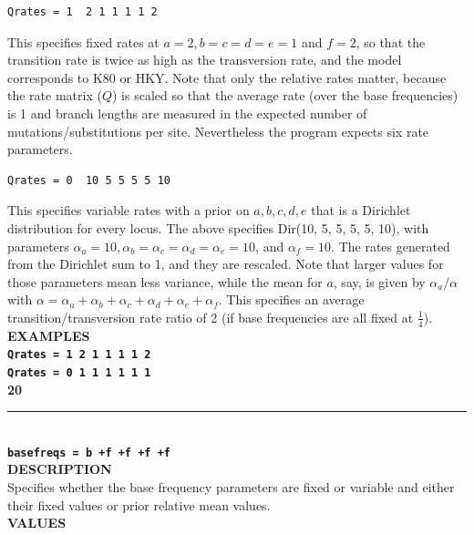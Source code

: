\documentclass{book}
\numberwithin{equation}{section} \renewcommand{\baselinestretch}{0.55}
\begin{document}
\begin{verbatim}
Qrates = 1  2 1 1 1 1 2
\end{verbatim}
This specifies fixed rates at $a = 2, b = c = d = e = 1$ and $f = 2$,
so that the transition rate is twice as high as the transversion rate,
and the model corresponds to K80 or HKY.  Note that only the relative
rates matter, because the rate matrix ($Q$) is scaled so that the
average rate (over the base frequencies) is 1 and branch lengths are
measured in the expected number of mutations/substitutions per site.
Nevertheless the program expects six rate parameters.
\begin{verbatim}
Qrates = 0  10 5 5 5 5 10 
\end{verbatim}
This specifies variable rates with a prior on $a, b, c, d, e$ that is
a Dirichlet distribution for every locus.  The above specifies Dir(10,
5, 5, 5, 5, 10), with parameters
$\alpha_a = 10, \alpha_b = \alpha_c = \alpha_d = \alpha_e = 10$, and
$\alpha_f = 10$.  The rates generated from the Dirichlet sum to 1, and
they are rescaled.  Note that larger values for those parameters mean
less variance, while the mean for $a$, say, is given by
$\alpha_a/\alpha$ with
$\alpha = \alpha_a + \alpha_b + \alpha_c + \alpha_d + \alpha_e +
\alpha_f$.
This specifies an average transition/transversion rate ratio of 2 (if base frequencies are all fixed at $\frac{1}{4}$). \vspace{5pt}\\
\textbf{EXAMPLES} \vspace{5pt}\\
\textbf{\texttt{Qrates = 1  2 1 1 1 1 2}} \vspace{5pt}\\
\textbf{\texttt{Qrates = 0  1 1 1 1 1 1}}\vspace{10pt}\\
\textbf{{\large 20}} \\
\noindent\rule{\textwidth}{0.8pt} \\
\textbf{{\Large \texttt{basefreqs = b +f +f +f +f}}} \vspace{5pt}\\
\textbf{DESCRIPTION} \vspace{5pt}\\
Specifies whether the base frequency parameters are fixed or variable
and either their fixed values or prior relative mean values. \vspace{5pt}\\
\textbf{VALUES} \vspace{5pt}\\
\end{document}
